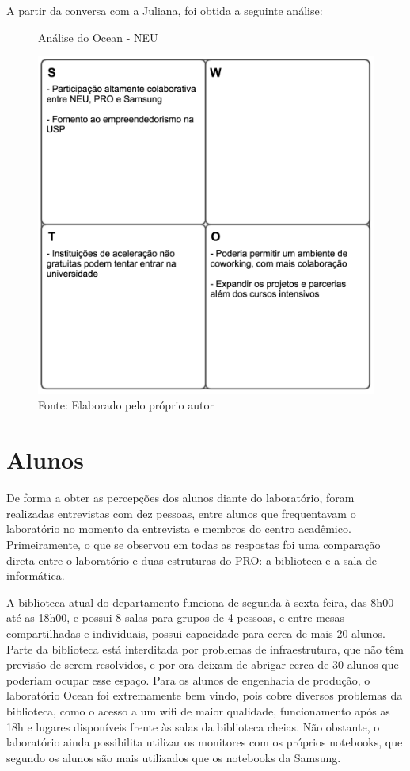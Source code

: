 A partir da conversa com a Juliana, foi obtida a seguinte análise:

\begin{figure}[H]
\caption{Análise do Ocean - NEU}
\centerline{\includegraphics[scale=0.75]{img/neuswot}}
\label{fig:swotneu}
\caption* {Fonte: Elaborado pelo próprio autor}
\end{figure}

\section{Alunos}

De forma a obter as percepções dos alunos diante do laboratório, foram realizadas entrevistas com dez pessoas, entre alunos que frequentavam o laboratório no momento da entrevista e membros do centro acadêmico. Primeiramente, o que se observou em todas as respostas foi uma comparação direta entre o laboratório e duas estruturas do PRO: a biblioteca e a sala de informática. 

A biblioteca atual do departamento funciona de segunda à sexta-feira, das 8h00 até as 18h00, e possui 8 salas para grupos de 4 pessoas, e entre mesas compartilhadas e individuais, possui capacidade para cerca de mais 20 alunos. Parte da biblioteca está interditada por problemas de infraestrutura, que não têm previsão de serem resolvidos, e por ora deixam de abrigar cerca de 30 alunos que poderiam ocupar esse espaço. Para os alunos de engenharia de produção, o laboratório Ocean foi extremamente bem vindo, pois cobre diversos problemas da biblioteca, como o acesso a um wifi de maior qualidade, funcionamento após as 18h e lugares disponíveis frente às salas da biblioteca cheias. Não obstante, o laboratório ainda possibilita utilizar os monitores com os próprios notebooks, que segundo os alunos são mais utilizados que os notebooks da Samsung.

